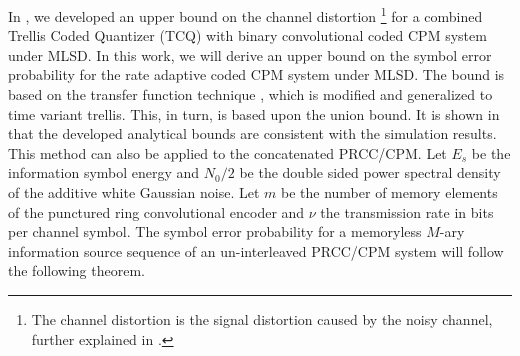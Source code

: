 \documentclass[12pt,twoside,onecolumn,a4paper,english]{IEEEtran2e}
\begin{document}
In \cite{tcqcpmICC}, we developed an upper bound on the channel
distortion \footnote{The channel distortion is the signal
distortion caused by the noisy channel, further explained in
\cite{tcqcpmICC}.}
for a combined Trellis Coded Quantizer (TCQ)
with binary convolutional coded CPM system under MLSD.
In this work, we will derive an upper bound on the symbol error probability for the rate adaptive coded CPM system under MLSD. The bound
is based on the transfer function technique \cite{SER-bound},
which is modified and generalized to time variant trellis. This, in turn, is based upon the union bound. It is
shown in \cite{tcqcpmICC} that the developed analytical bounds are
consistent with the simulation results.
This method can also be
applied to the concatenated PRCC/CPM.
Let $E_s$ be the information
symbol energy and $N_0/2$ be the double sided power spectral
density of the additive white Gaussian noise. Let $m$ be the
number of memory elements of the  punctured ring convolutional
encoder and $\nu$ the transmission rate in bits per channel
symbol. The symbol error probability for a memoryless $M$-ary information source sequence of an un-interleaved PRCC/CPM system will follow the following theorem.
\end{document}
